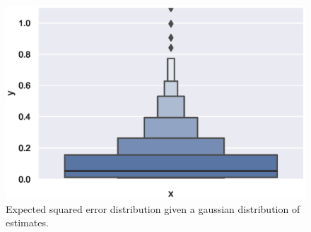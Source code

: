 \begin{figure}[htbp]
    \centering
    \includegraphics[scale=0.5]
    {./content/figures/expected_gaussian_distribution_squared_error}
    \caption{Expected squared error distribution given a gaussian distribution
    of estimates.}
    \label{fig:expected_gaussian_distribution_squared_error}
\end{figure}
